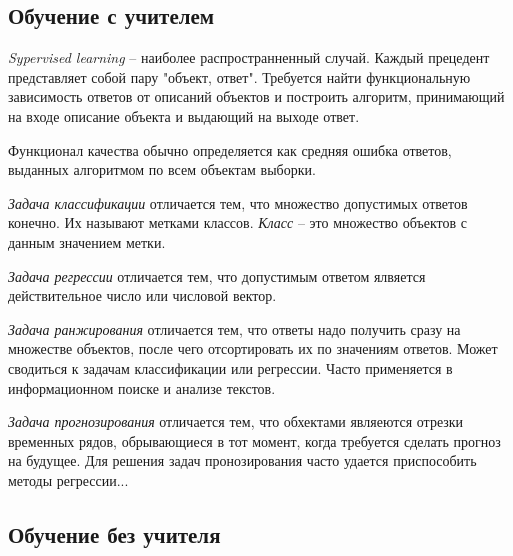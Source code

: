 
\subsection{Обучение с учителем}

\begin{definition}
  \emph{Sypervised learning} -- наиболее распространненный случай. Каждый прецедент представляет собой пару "объект, ответ". Требуется найти функциональную зависимость ответов от описаний объектов и построить алгоритм, принимающий на входе описание объекта и выдающий на выходе ответ.

  Функционал качества обычно определяется как средняя ошибка ответов, выданных алгоритмом по всем объектам выборки.
\end{definition}

\begin{definition}
  \emph{Задача классификации} отличается тем, что множество допустимых ответов конечно. Их называют метками классов. \emph{Класс} -- это множество объектов с данным значением метки.
\end{definition}

\begin{definition}
  \emph{Задача регрессии} отличается тем, что допустимым ответом ялвяется действительное число или числовой вектор.
\end{definition}

\begin{definition}
  \emph{Задача ранжирования} отличается тем, что ответы надо получить сразу на множестве объектов, после чего отсортировать их по значениям ответов. Может сводиться к задачам классификации или регрессии. Часто применяется в информационном поиске и анализе текстов.
\end{definition}

\begin{definition}
  \emph{Задача прогнозирования} отличается тем, что обхектами являеются отрезки временных рядов, обрывающиеся в тот момент, когда требуется сделать прогноз на будущее. Для решения задач пронозирования часто удается приспособить методы регрессии...
\end{definition}

\subsection{Обучение без учителя}

